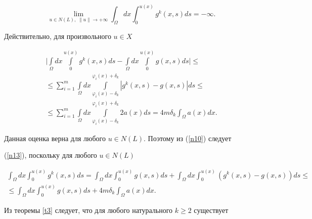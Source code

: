 \begin{equation}


\label{n13}


\lim\limits_{u\in N(L),\; \|u\|\to +\infty}\int_{\Omega}dx


\int_0^{u(x)}g^k(x, s)ds=-\infty.


\end{equation}


Действительно, для произвольного $u\in X$


\begin{multline*}


\bigg|\int\limits_{\Omega}dx\int\limits_0^{u(x)}g^k(x, s)ds-


\int\limits_{\Omega}dx\int\limits_0^{u(x)}g(x, s)ds\bigg|\leq \\


%


\le \sum_{i=1}^m\int\limits_{\Omega}dx


\int\limits_{\varphi_i(x)-\delta_k}^{\varphi_i(x)+\delta_k}


|g^k(x, s)-g(x, s)|ds\leq \\


%


\le \sum_{i=1}^m\int\limits_{\Omega}dx


\int\limits_{\varphi_i(x)-\delta_k}^{\varphi_i(x)+\delta_k}2a(x)ds=


4m\delta_k\int_{\Omega}a(x)dx.


\end{multline*}


Данная оценка верна для любого $u\in N(L)$. Поэтому из (\ref{n10}) следует


(\ref{n13}), поскольку для любого $u\in N(L)$


\begin{multline*}


\int_{\Omega}dx\int_0^{u(x)}g^k(x, s)ds=


\int_{\Omega}dx\int_0^{u(x)}g(x, s)ds+


\int_{\Omega}dx\int_0^{u(x)}(g^k(x, s)-g(x, s))ds\leq \\


%


\le\int_{\Omega}dx\int_0^{u(x)}g(x, s)ds+


4m\delta_k\int_{\Omega}a(x)dx.


\end{multline*}





Из теоремы \ref{t3} следует, что для любого натурального $k\geq 2$ существует



